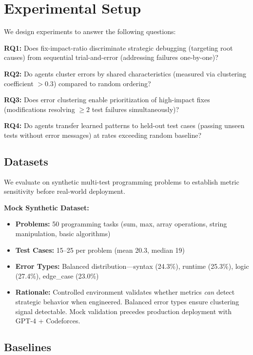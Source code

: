 \section{Experimental Setup}

We design experiments to answer the following questions:

\textbf{RQ1:} Does fix-impact-ratio discriminate strategic debugging (targeting root causes) from sequential trial-and-error (addressing failures one-by-one)?

\textbf{RQ2:} Do agents cluster errors by shared characteristics (measured via clustering coefficient $> 0.3$) compared to random ordering?

\textbf{RQ3:} Does error clustering enable prioritization of high-impact fixes (modifications resolving $\geq 2$ test failures simultaneously)?

\textbf{RQ4:} Do agents transfer learned patterns to held-out test cases (passing unseen tests without error messages) at rates exceeding random baseline?

\subsection{Datasets}

We evaluate on synthetic multi-test programming problems to establish metric sensitivity before real-world deployment.

\textbf{Mock Synthetic Dataset:}
\begin{itemize}
    \item \textbf{Problems:} 50 programming tasks (sum, max, array operations, string manipulation, basic algorithms)
    \item \textbf{Test Cases:} 15--25 per problem (mean 20.3, median 19)
    \item \textbf{Error Types:} Balanced distribution---syntax (24.3\%), runtime (25.3\%), logic (27.4\%), edge\_case (23.0\%)
    \item \textbf{Rationale:} Controlled environment validates whether metrics \emph{can} detect strategic behavior when engineered. Balanced error types ensure clustering signal detectable. Mock validation precedes production deployment with GPT-4 + Codeforces.
\end{itemize}

\subsection{Baselines}

